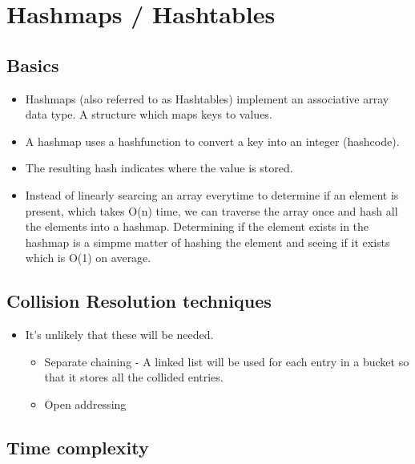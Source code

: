 \chapter{Hashmaps / Hashtables}

\section{Basics}
	\begin{itemize}
		\item Hashmaps (also referred to as Hashtables) implement an associative array data type. A structure which maps keys to values.
		\item A hashmap uses a hashfunction to convert a key into an integer (hashcode).
		\item The resulting hash indicates where the value is stored.
		\item Instead of linearly searcing an array everytime to determine if an element is present, which takes O(n) time, we can traverse the array once and hash all the elements into a hashmap. Determining if the element exists in the hashmap is a simpme matter of hashing the element and seeing if it exists which is O(1) on average.
	\end{itemize}
	
	\section{Collision Resolution techniques}
	\begin{itemize}
		\item It's unlikely that these will be needed.
			\begin{itemize}
				\item Separate chaining - A linked list will be used for each entry in a bucket so that it stores all the collided entries.
				\item Open addressing
			\end{itemize}
	\end{itemize}
	
	\section{Time complexity}
	